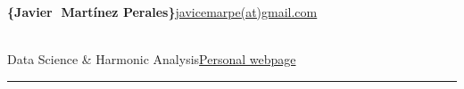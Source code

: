 \documentclass{style_classes/cv_black}
\newcommand{\tc}[2]{\textcolor{#1}{#2}}
\begin{document}
	\begin{center}
		\begin{flushleft}
      {\Huge   {\bfseries \textcolor{whitegray}{\{}\textcolor{niceblue}{Javier}\hspace{0.5pt}\tc{white}{:}\hspace{0.5pt}\textcolor{nicegray}{ Martínez Perales}\textcolor{whitegray}{\}}}}\tc{niceblue}{\hfill\href{mailto:javicemarpe@gmail.com}{javicemarpe(at)gmail.com} }\par
    \end{flushleft}
	\tc{niceblue}{
		\hfill \\%
		{\Large\textcolor{nicegraydark}{Data Science \textcolor{nicegray}{\&} Harmonic Analysis}}\hfill  \href{http://sites.google.com/view/javiermartinez/home}{Personal webpage}
	}
	\end{center}
	\tc{niceblue}{\rule{\textwidth}{2pt}}
	\vspace{0.05in}

%
%
%


\end{document}
